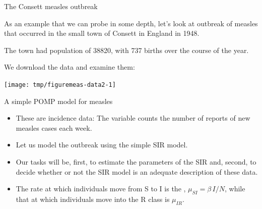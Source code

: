 \begin{frame}{The Consett measles outbreak}

  As an example that we can probe in some depth, let's look at outbreak of measles that occurred in the small town of Consett in England in 1948.

  The town had population of 38820, with 737 births over the course of the year.

  \framebreak

  We download the data and examine them:

\begin{knitrout}\small
{}\color{fgcolor}
\end{knitrout}

  \framebreak
  
\begin{knitrout}\small
{}\color{fgcolor}

{\centering \texttt{[image: tmp/figuremeas-data2-1]} 

}



\end{knitrout}
  
\end{frame}


\begin{frame}[fragile]{A simple POMP model for measles}
  \begin{itemize}
  \item These are incidence data: The  variable counts the number of reports of new measles cases each week.
  \item Let us model the outbreak using the simple SIR model.
  \item Our tasks will be, first, to estimate the parameters of the SIR and, second, to decide whether or not the SIR model is an adequate description of these data.
  \item The rate at which individuals move from S to I is the , $\mu_{SI}=\beta\,I/N$, while that at which individuals move into the R class is $\mu_{IR}$.
  \end{itemize}
\end{frame}

